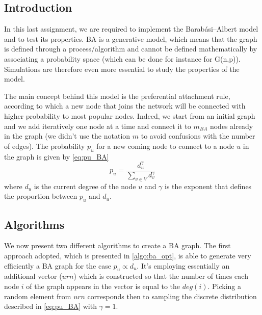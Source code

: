 
\graphicspath{{../assignment4/figures/}}

\subsection{Introduction}
In this last assignment, we are required to implement the Barabási–Albert model and to test its properties. BA is a generative model, which means that the graph is defined through a process/algorithm and cannot be defined mathematically by associating a probability space (which can be done for instance for G(n,p)).
Simulations are therefore even more essential to study the properties of the model.

The main concept behind this model is the preferential attachment rule, according to which a new node that joins the network will be connected with higher probability to most popular nodes.
Indeed, we start from an initial graph and we add iteratively one node at a time and connect it to $m_{BA}$ nodes already in the graph (we didn't use the notation $m$ to avoid confusions with the number of edges). The probability $p_u$ for a new coming node to connect to a node $u$ in the graph is given by \cref{eq:pu_BA}
\begin{equation}
p_u = \frac{d_u^\gamma}{\sum_{v \in V}{d_v^\gamma}}\label{eq:pu_BA}
\end{equation}
where $d_u$ is the current degree of the node $u$ and $\gamma$ is the exponent that defines the proportion between $p_u$ and $d_u$.

\subsection{Algorithms}
We now present two different algorithms to create a BA graph. The first approach adopted, which is presented in \cref{algo:ba_opt}, is able to generate very efficiently a BA graph for the case $p_u \propto d_u$. It's employing essentially an additional vector ($urn$) which is constructed so that the number of times each node $i$ of the graph appears in the vector is equal to the $deg(i)$. Picking a random element from $urn$ corresponds then to sampling the discrete distribution described in \cref{eq:pu_BA} with $\gamma=1$.

